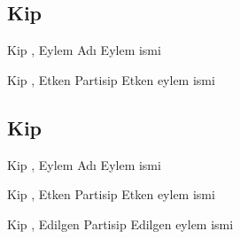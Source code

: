 \subsection*{Kip }

\begin{kip}{}{Kip , Eylem Adı}
  Eylem ismi
\end{kip}

\begin{kip}{}{Kip , Etken Partisip}
  Etken eylem ismi
\end{kip}


\subsection*{Kip }

\begin{kip}{}{Kip , Eylem Adı}
  Eylem ismi
\end{kip}

\begin{kip}{}{Kip , Etken Partisip}
  Etken eylem ismi
\end{kip}

\begin{kip}{}{Kip , Edilgen Partisip}
  Edilgen eylem ismi
\end{kip}





